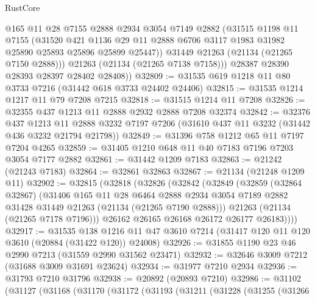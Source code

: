 \begin{lexlean}{RustCore}
\begin{coremodule}
            @165
            @11
            @28
            @7155
            @2888
            @2934
            @3054
            @7149
            @2882
            (@31515
              @1198
              @11
              @7155
              (@31520
                @421
                @1136
                @29
                @11
                @2888
                @6706
                @3117
                @1983
                @31982
                @25890
                @25893
                @25896
                @25899
                @25447))
            @31449
            @21263
            (@21134 (@21265 @7150 @2888)))
          @21263
          (@21134 (@21265 @7138 @7158)))
        @28387
        @28390
        @28393
        @28397
        @28402
        @28408))
@32809 := @31535 @619 @1218 @11 @80 @3733 @7216 (@31442 @618 @3733 @24402 @24406)
@32815 := @31535 @1214 @1217 @11 @79 @7208 @7215
@32818 := @31515 @1214 @11 @7208
@32826 := @32355 @437 @1213 @11 @2888 @2932 @2888 @7208 @32374
@32842 := @32376
    @437
    @1213
    @11
    @2888
    @3232
    @7197
    @7206
    (@31610 @437 @11 @3232 (@31442 @436 @3232 @21794 @21798))
@32849 := @31396 @758 @1212 @65 @11 @7197 @7204 @4265
@32859 := @31405 @1210 @648 @11 @40 @7183 @7196 @7203 @3054 @7177 @2882
@32861 := @31442 @1209 @7183
@32863 := @21242 (@21243 @7183)
@32864 := @32861 @32863
@32867 := @21134 (@21248 @1209 @11)
@32902 := @32815
    (@32818
      (@32826
        (@32842
          (@32849
            (@32859
              (@32864 @32867)
              (@31406
                @165
                @11
                @28
                @6464
                @2888
                @2934
                @3054
                @7189
                @2882
                @31428
                @31449
                @21263
                (@21134 (@21265 @7190 @2888)))
              @21263
              (@21134 (@21265 @7178 @7196)))
            @26162
            @26165
            @26168
            @26172
            @26177
            @26183))))
@32917 := @31535
    @138
    @1216
    @11
    @47
    @3610
    @7214
    (@31417 @120 @11 @120 @3610 (@20884 (@31422 @120)) @24008)
@32926 := @31855 @1190 @23 @46 @2990 @7213 (@31559 @2990 @31562 @23471)
@32932 := @32646 @3009 @7212 (@31688 @3009 @31691 @23624)
@32934 := @31977 @7210 @2934
@32936 := @31793 @7210 @31796
@32938 := @20892 (@20893 @7210)
@32986 := @31102
    (@31127
      (@31168
        (@31170
          (@31172
            (@31193
              (@31211
                (@31228
                  (@31255
                    (@31266

\end{coremodule}
\end{lexlean}

